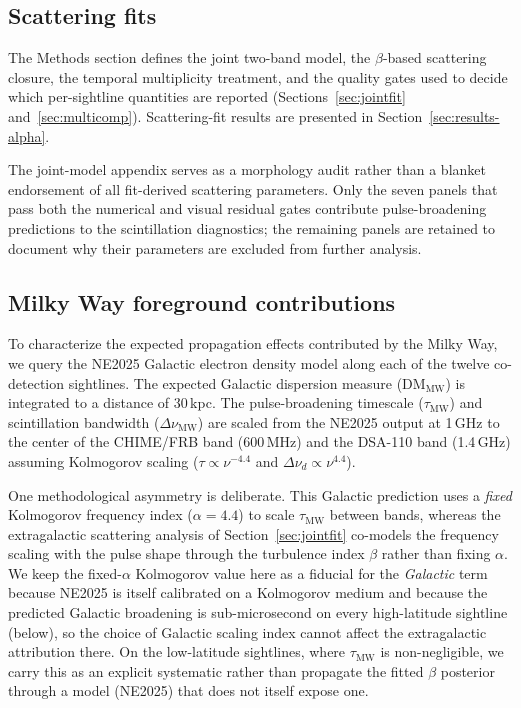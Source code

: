 

\subsection{Scattering fits}
\label{sec:obs-scatt}

The Methods section defines the joint two-band model, the $\beta$-based
scattering closure, the temporal multiplicity treatment, and the quality gates
used to decide which per-sightline quantities are reported
(Sections~\ref{sec:jointfit} and~\ref{sec:multicomp}). Scattering-fit results
are presented in Section~\ref{sec:results-alpha}.

The joint-model appendix serves as a morphology audit rather than a blanket
endorsement of all fit-derived scattering parameters. Only the seven panels
that pass both the numerical and visual residual gates contribute
pulse-broadening predictions to the scintillation diagnostics; the remaining
panels are retained to document why their parameters are excluded from
further analysis.

\subsection{Milky Way foreground contributions}
\label{sec:obs-mw}

To characterize the expected propagation effects contributed by the Milky Way, we query the NE2025 Galactic electron density model \citep{Ocker2026} along each of the twelve co-detection sightlines. The expected Galactic dispersion measure ($\text{DM}_{\text{MW}}$) is integrated to a distance of 30\,kpc. The pulse-broadening timescale ($\tau_{\text{MW}}$) and scintillation bandwidth ($\Delta\nu_{\text{MW}}$) are scaled from the NE2025 output at 1\,GHz to the center of the CHIME/FRB band (600\,MHz) and the DSA-110 band (1.4\,GHz) assuming Kolmogorov scaling ($\tau \propto \nu^{-4.4}$ and $\Delta\nu_d \propto \nu^{4.4}$).

One methodological asymmetry is deliberate. This Galactic prediction
uses a \emph{fixed} Kolmogorov frequency index ($\alpha=4.4$) to scale
$\tau_{\text{MW}}$ between bands, whereas the extragalactic scattering analysis
of Section~\ref{sec:jointfit} co-models the frequency scaling with the pulse
shape through the turbulence index $\beta$ rather than fixing $\alpha$. We keep
the fixed-$\alpha$ Kolmogorov value here as a fiducial for the \emph{Galactic}
term because NE2025 is itself calibrated on a Kolmogorov medium and because the
predicted Galactic broadening is sub-microsecond on every high-latitude
sightline (below), so the choice of Galactic scaling index cannot affect the
extragalactic attribution there. On the low-latitude sightlines, where
$\tau_{\text{MW}}$ is non-negligible, we carry this as an explicit systematic
rather than propagate the fitted $\beta$ posterior through a model (NE2025) that
does not itself expose one.

